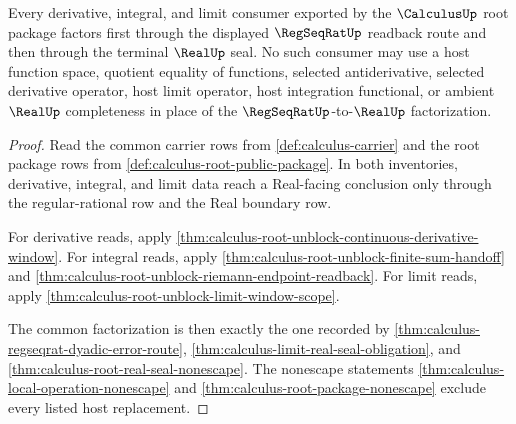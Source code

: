 \begin{theorem}
\label{thm:calculus-root-unblock-regseqrat-real-seal-factorization}
Every derivative, integral, and limit consumer exported by the $\CalculusUp$ root package factors first through the displayed $\RegSeqRatUp$ readback route and then through the terminal $\RealUp$ seal. No such consumer may use a host function space, quotient equality of functions, selected antiderivative, selected derivative operator, host limit operator, host integration functional, or ambient $\RealUp$ completeness in place of the $\RegSeqRatUp$-to-$\RealUp$ factorization.
\end{theorem}
\begin{proof}
Read the common carrier rows from \autoref{def:calculus-carrier} and the root package rows from \autoref{def:calculus-root-public-package}. In both inventories, derivative, integral, and limit data reach a Real-facing conclusion only through the regular-rational row and the Real boundary row.

For derivative reads, apply \autoref{thm:calculus-root-unblock-continuous-derivative-window}. For integral reads, apply \autoref{thm:calculus-root-unblock-finite-sum-handoff} and \autoref{thm:calculus-root-unblock-riemann-endpoint-readback}. For limit reads, apply \autoref{thm:calculus-root-unblock-limit-window-scope}.

The common factorization is then exactly the one recorded by \autoref{thm:calculus-regseqrat-dyadic-error-route}, \autoref{thm:calculus-limit-real-seal-obligation}, and \autoref{thm:calculus-root-real-seal-nonescape}. The nonescape statements \autoref{thm:calculus-local-operation-nonescape} and \autoref{thm:calculus-root-package-nonescape} exclude every listed host replacement.
\end{proof}

